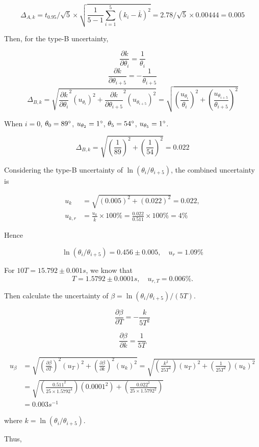 $$ \Delta_{A,k}=t_{0.95}/\sqrt{5}\times
\sqrt{\frac{1}{5-1}\sum_{i=1}^5(k_i-\bar{k})^2}=2.78/\sqrt{5}\times
0.00444 = 0.005 $$ 

Then, for the type-B uncertainty, 

$$ \frac{\partial k}{\partial \theta_{i}}=\frac{1}{\theta_i} $$
$$ \frac{\partial k}{\partial \theta_{i+5}}=-\frac{1}{\theta_{i+5}} $$ 
$$ \Delta_{B,k}=\sqrt{\frac{\partial k}{\partial
    \theta_{i}}^2(u_{\theta_i})^2+\frac{\partial k}{\partial
    \theta_{i+5}}^2(u_{\theta_{i+5}})^2}
=\sqrt{(\frac{u_{\theta_i}}{\theta_i})^2+(\frac{u_{\theta_{i+5}}}{\theta_{i+5}})^2}  $$ 


When $i=0$, $\theta_0=89^\circ$, $u_{\theta_2}=1^\circ$,
$\theta_5=54^\circ$, $u_{\theta_5}=1^\circ$. 

\[
\Delta_{B,k}=\sqrt{(\frac{1}{89})^2+(\frac{1}{54})^2}=0.022 
\]

Considering the type-B uncertainty of $\ln(\theta_i/\theta_{i+5})$, the combined
uncertainty is 

\[
\begin{split}
u_{k}&=\sqrt{(0.005)^2+(0.022)^2}= 0.022,\\
u_{k,r}&=\frac{u_k}{\bar{k}}\times100\%=\frac{0.022}{0.511}\times100\%=4\%
\end{split}
\]

Hence

$$ \ln(\theta_i/\theta_{i+5})=0.456\pm0.005, \quad u_r=1.09\% $$ 

For $10T=15.792 \pm 0.001s$, we know that
\[
T=1.5792\pm0.0001s, \quad u_{r,T}=0.006\%.
\]

Then calculate the uncertainty of $\beta=\ln(\theta_i/\theta_{i+5})/(5T)$.

$$ \frac{\partial \beta}{\partial T}=-\frac{k}{5T^2}$$ 

$$ \frac{\partial \beta}{\partial k}=\frac{1}{5T} $$

\[
\begin{split}
u_{\beta}&=\sqrt{(\frac{\partial \beta}{\partial T})^2(u_T)^2+(\frac{\partial
    \beta}{\partial k})^2(u_k)^2}  
=\sqrt{(\frac{k^2}{25T^4})(u_T)^2+(\frac{1}{25T^2})(u_k)^2}\\
&=\sqrt{(\frac{0.511^2}{25\times1.5792^4})(0.0001^2)+(\frac{0.022^2}{25\times1.579
    2^2})}  \\ 
&= 0.003s^{-1} 
\end{split}
\]

where $k=\ln(\theta_i/\theta_{i+5})$.

Thus, 

